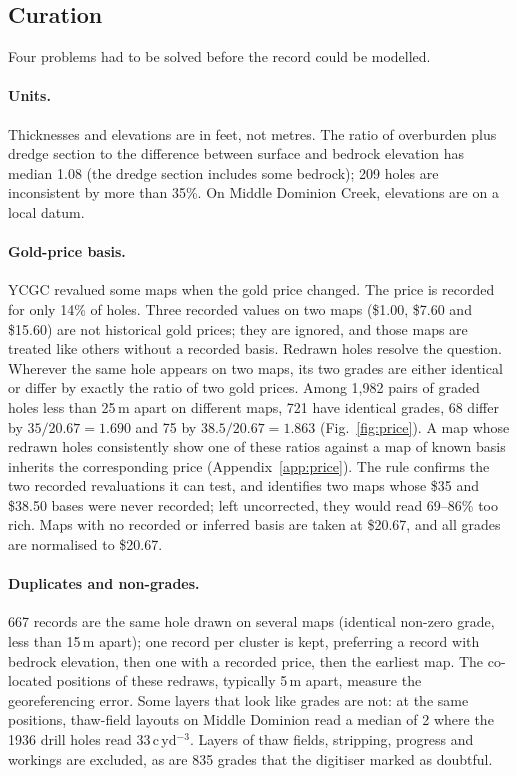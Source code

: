 \documentclass[11pt,a4paper]{article}
\theoremstyle{remark}
\newcommand{\cyd}{c\,yd$^{-3}$}
\begin{document}
\subsection{Curation}

Four problems had to be solved before the record could be modelled.

\paragraph{Units.} Thicknesses and elevations are in feet, not metres. The ratio of overburden plus dredge section to the difference between surface and bedrock elevation has median 1.08 (the dredge section includes some bedrock); 209 holes are inconsistent by more than 35\%. On Middle Dominion Creek, elevations are on a local datum.

\paragraph{Gold-price basis.} YCGC revalued some maps when the gold price changed. The price is recorded for only 14\% of holes. Three recorded values on two maps (\$1.00, \$7.60 and \$15.60) are not historical gold prices; they are ignored, and those maps are treated like others without a recorded basis. Redrawn holes resolve the question. Wherever the same hole appears on two maps, its two grades are either identical or differ by exactly the ratio of two gold prices. Among 1,982 pairs of graded holes less than 25\,m apart on different maps, 721 have identical grades, 68 differ by $35/20.67 = 1.690$ and 75 by $38.5/20.67 = 1.863$ (Fig.~\ref{fig:price}). A map whose redrawn holes consistently show one of these ratios against a map of known basis inherits the corresponding price (Appendix~\ref{app:price}). The rule confirms the two recorded revaluations it can test, and identifies two maps whose \$35 and \$38.50 bases were never recorded; left uncorrected, they would read 69--86\% too rich. Maps with no recorded or inferred basis are taken at \$20.67, and all grades are normalised to \$20.67.

\paragraph{Duplicates and non-grades.} 667 records are the same hole drawn on several maps (identical non-zero grade, less than 15\,m apart); one record per cluster is kept, preferring a record with bedrock elevation, then one with a recorded price, then the earliest map. The co-located positions of these redraws, typically 5\,m apart, measure the georeferencing error. Some layers that look like grades are not: at the same positions, thaw-field layouts on Middle Dominion read a median of 2 where the 1936 drill holes read 33\,\cyd. Layers of thaw fields, stripping, progress and workings are excluded, as are 835 grades that the digitiser marked as doubtful.
\end{document}
